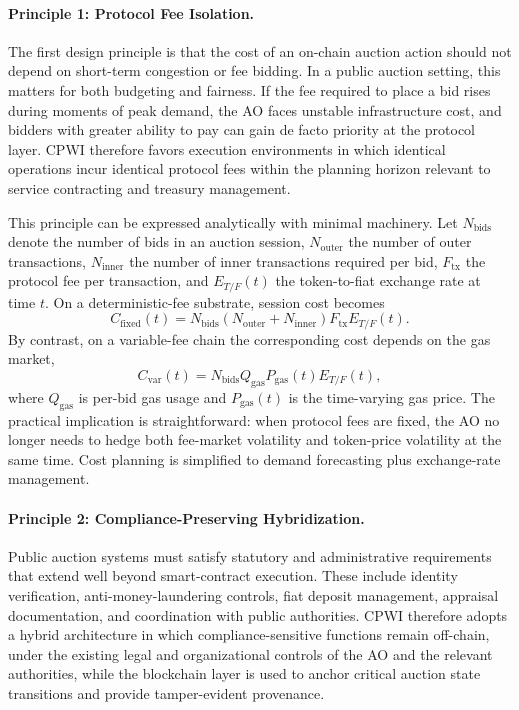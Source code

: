 \documentclass[runningheads]{llncs}
\begin{document}
\paragraph{Principle 1: Protocol Fee Isolation.}
The first design principle is that the cost of an on-chain auction action should
not depend on short-term congestion or fee bidding. In a public auction setting,
this matters for both budgeting and fairness. If the fee required to place a bid
rises during moments of peak demand, the AO faces unstable infrastructure cost,
and bidders with greater ability to pay can gain de facto priority at the protocol
layer. CPWI therefore favors execution environments in which identical
operations incur identical protocol fees within the planning horizon relevant to
service contracting and treasury management.

This principle can be expressed analytically with minimal machinery. Let $N_{\text{bids}}$ denote the number of bids in an auction session, $N_{\text{outer}}$ the number of outer transactions, $N_{\text{inner}}$ the number of inner transactions required per bid, $F_{\text{tx}}$ the protocol fee per transaction, and $E_{T/F}(t)$ the token-to-fiat exchange rate at time $t$. On a
deterministic-fee substrate, session cost becomes
\begin{equation}
C_{\text{fixed}}(t) = N_{\text{bids}}(N_{\text{outer}} + N_{\text{inner}})F_{\text{tx}}E_{T/F}(t).
\end{equation}
By contrast, on a variable-fee chain the corresponding cost depends on the gas
market,
\begin{equation}
C_{\text{var}}(t) = N_{\text{bids}}Q_{\text{gas}}P_{\text{gas}}(t)E_{T/F}(t),
\end{equation}
where $Q_{\text{gas}}$ is per-bid gas usage and $P_{\text{gas}}(t)$ is the time-varying gas
price. The practical implication is straightforward: when protocol fees are fixed,
the AO no longer needs to hedge both fee-market volatility and token-price
volatility at the same time. Cost planning is simplified to demand forecasting
plus exchange-rate management.

\paragraph{Principle 2: Compliance-Preserving Hybridization.}
Public auction systems must satisfy statutory and administrative requirements
that extend well beyond smart-contract execution. These include identity
verification, anti-money-laundering controls, fiat deposit management, appraisal
documentation, and coordination with public authorities. CPWI therefore adopts
a hybrid architecture in which compliance-sensitive functions remain off-chain,
under the existing legal and organizational controls of the AO and the relevant
authorities, while the blockchain layer is used to anchor critical auction state
transitions and provide tamper-evident provenance.
\end{document}
